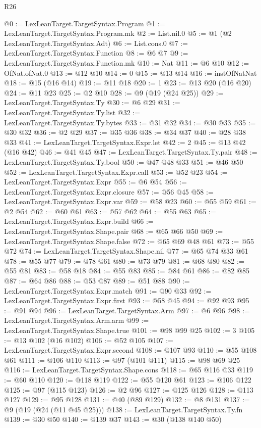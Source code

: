 \begin{lexlean}{R26}
\begin{coremodule}
@0 := LexLeanTarget.TargetSyntax.Program
@1 := LexLeanTarget.TargetSyntax.Program.mk
@2 := List.nil.{0}
@5 := @1 (@2 LexLeanTarget.TargetSyntax.Adt)
@6 := List.cons.{0}
@7 := LexLeanTarget.TargetSyntax.Function
@8 := @6 @7
@9 := LexLeanTarget.TargetSyntax.Function.mk
@10 := Nat
@11 := @6 @10
@12 := OfNat.ofNat.{0}
@13 := @12 @10
@14 := 0
@15 := @13 @14
@16 := instOfNatNat
@18 := @15 (@16 @14)
@19 := @11 @18
@20 := 1
@23 := @13 @20 (@16 @20)
@24 := @11 @23
@25 := @2 @10
@28 := @9 (@19 (@24 @25))
@29 := LexLeanTarget.TargetSyntax.Ty
@30 := @6 @29
@31 := LexLeanTarget.TargetSyntax.Ty.list
@32 := LexLeanTarget.TargetSyntax.Ty.bytes
@33 := @31 @32
@34 := @30 @33
@35 := @30 @32
@36 := @2 @29
@37 := @35 @36
@38 := @34 @37
@40 := @28 @38 @33
@41 := LexLeanTarget.TargetSyntax.Expr.let
@42 := 2
@45 := @13 @42 (@16 @42)
@46 := @41 @45
@47 := LexLeanTarget.TargetSyntax.Ty.pair
@48 := LexLeanTarget.TargetSyntax.Ty.bool
@50 := @47 @48 @33
@51 := @46 @50
@52 := LexLeanTarget.TargetSyntax.Expr.call
@53 := @52 @23
@54 := LexLeanTarget.TargetSyntax.Expr
@55 := @6 @54
@56 := LexLeanTarget.TargetSyntax.Expr.closure
@57 := @56 @45
@58 := LexLeanTarget.TargetSyntax.Expr.var
@59 := @58 @23
@60 := @55 @59
@61 := @2 @54
@62 := @60 @61
@63 := @57 @62
@64 := @55 @63
@65 := LexLeanTarget.TargetSyntax.Expr.build
@66 := LexLeanTarget.TargetSyntax.Shape.pair
@68 := @65 @66 @50
@69 := LexLeanTarget.TargetSyntax.Shape.false
@72 := @65 @69 @48 @61
@73 := @55 @72
@74 := LexLeanTarget.TargetSyntax.Shape.nil
@77 := @65 @74 @33 @61
@78 := @55 @77
@79 := @78 @61
@80 := @73 @79
@81 := @68 @80
@82 := @55 @81
@83 := @58 @18
@84 := @55 @83
@85 := @84 @61
@86 := @82 @85
@87 := @64 @86
@88 := @53 @87
@89 := @51 @88
@90 := LexLeanTarget.TargetSyntax.Expr.match
@91 := @90 @33
@92 := LexLeanTarget.TargetSyntax.Expr.first
@93 := @58 @45
@94 := @92 @93
@95 := @91 @94
@96 := LexLeanTarget.TargetSyntax.Arm
@97 := @6 @96
@98 := LexLeanTarget.TargetSyntax.Arm.arm
@99 := LexLeanTarget.TargetSyntax.Shape.true
@101 := @98 @99 @25
@102 := 3
@105 := @13 @102 (@16 @102)
@106 := @52 @105
@107 := LexLeanTarget.TargetSyntax.Expr.second
@108 := @107 @93
@110 := @55 @108 @61
@111 := @106 @110
@113 := @97 (@101 @111)
@115 := @98 @69 @25
@116 := LexLeanTarget.TargetSyntax.Shape.cons
@118 := @65 @116 @33
@119 := @60 @110
@120 := @118 @119
@122 := @55 @120 @61
@123 := @106 @122
@125 := @97 (@115 @123)
@126 := @2 @96
@127 := @125 @126
@128 := @113 @127
@129 := @95 @128
@131 := @40 (@89 @129)
@132 := @8 @131
@137 := @9 (@19 (@24 (@11 @45 @25)))
@138 := LexLeanTarget.TargetSyntax.Ty.fn
@139 := @30 @50
@140 := @139 @37
@143 := @30 (@138 @140 @50)

\end{coremodule}
\end{lexlean}
